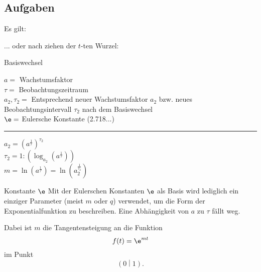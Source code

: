 \subsection*{Aufgaben}

\newpage

\begin{center}
  \end{center}

Es gilt:
\begin{center}
\end{center}

... oder nach ziehen der $t$-ten Wurzel:

\begin{gesetz}{Basiswechsel}{}

  \begin{center}\end{center}

 
  $a=$ Wachstumsfaktor\\
  $\tau=$ Beobachtungszeitraum\\
  $a_2, \tau_2=$ Entsprechend neuer Wachstumsfaktor $a_2$ bzw. neues
  Beobachtungsintervall $\tau_2$ nach dem Basiswechsel\\
  $\e=$ Eulersche Konstante (2.718...)\\
  \hrule
  \vspace{3mm}
  $a_2 = \left(a^\frac1\tau\right)^{\tau_2}$\\
  \vspace{3mm}
  $\tau_2=1 : \left(\log_{a_2}\left(a^\frac1\tau\right)\right)$\\
  \vspace{3mm}
  $m=\ln\left(a^\frac1\tau\right) =  \ln\left(a_2^\frac1{\tau_2}\right)$\\
\end{gesetz}

\begin{bemerkung}{Konstante $\e$}{}
  Mit der Eulerschen Konstanten $\e$ als Basis wird lediglich ein einziger
  Parameter (meist $m$ oder $q$) verwendet, um die Form der
  Exponentialfunktion zu beschreiben. Eine Abhängigkeit von $a$ zu
  $\tau$ fällt weg.

  Dabei ist $m$ die Tangentensteigung an die Funktion $$f(t) = \e^{mt}$$
  im Punkt $$\left(0\middle|1\right).$$
  \end{bemerkung}

